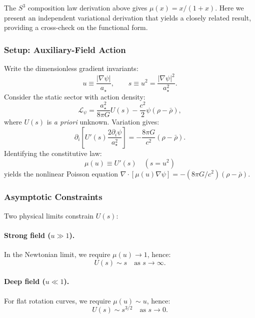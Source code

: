 The $S^3$ composition law derivation above gives $\mu(x) = x/(1+x)$. Here we 
present an independent variational derivation that yields a closely related 
result, providing a cross-check on the functional form.

\subsubsection{Setup: Auxiliary-Field Action}

Write the dimensionless gradient invariants:
\begin{equation}
u \equiv \frac{|\nabla\psi|}{a_\star}, \qquad s \equiv u^2 = \frac{|\nabla\psi|^2}{a_\star^2}.
\end{equation}
Consider the static sector with action density:
\begin{equation}
\mathcal{L}_\psi = \frac{a_\star^2}{8\pi G}U(s) - \frac{c^2}{2}\psi(\rho - \bar{\rho}),
\end{equation}
where $U(s)$ is \textit{a priori} unknown. Variation gives:
\begin{equation}
\partial_i\left[U'(s)\frac{2\partial_i\psi}{a_\star^2}\right] = -\frac{8\pi G}{c^2}(\rho - \bar{\rho}).
\end{equation}
Identifying the constitutive law:
\begin{equation}
\mu(u) \equiv U'(s) \quad (s = u^2)
\end{equation}
yields the nonlinear Poisson equation $\nabla\cdot[\mu(u)\nabla\psi] = -(8\pi G/c^2)(\rho - \bar{\rho})$.

\subsubsection{Asymptotic Constraints}

Two physical limits constrain $U(s)$:

\paragraph{Strong field ($u \gg 1$).}
In the Newtonian limit, we require $\mu(u) \to 1$, hence:
\begin{equation}
U(s) \sim s \quad \text{as } s \to \infty.
\end{equation}

\paragraph{Deep field ($u \ll 1$).}
For flat rotation curves, we require $\mu(u) \sim u$, hence:
\begin{equation}
U(s) \sim s^{3/2} \quad \text{as } s \to 0.
\end{equation}

